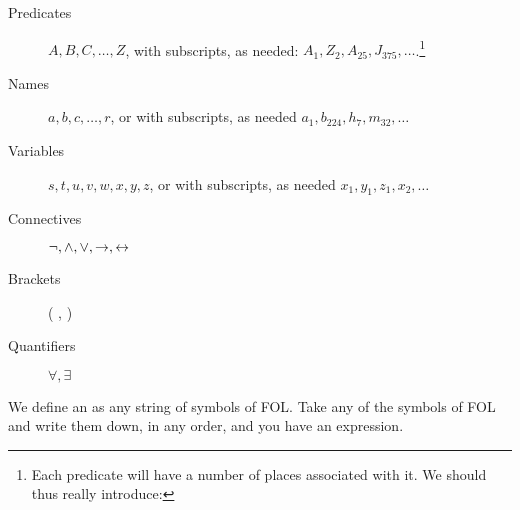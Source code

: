 \begin{description}
\item[Predicates] $A,B,C,\ldots,Z$,  
with subscripts, as needed: $A_1, Z_2,A_{25},J_{375},\ldots$.\footnote{Each predicate will have a number of places associated with it. We should thus really introduce:} 
\item[Names] $a,b,c,\ldots, r$, or
with subscripts, as needed $a_1, b_{224}, h_7, m_{32},\ldots$
\item[Variables] $s, t, u, v, w, x,y,z$, or
with subscripts, as needed $x_1, y_1, z_1, x_2,\ldots$
\item[Connectives]  $\neg,\wedge,\vee,\rightarrow,\leftrightarrow$
\item[Brackets] ( , )
\item[Quantifiers]  $\forall, \exists$
\end{description}
We define an  as any string of symbols of FOL. Take any of the symbols of FOL and write them down, in any order, and you have an expression.

